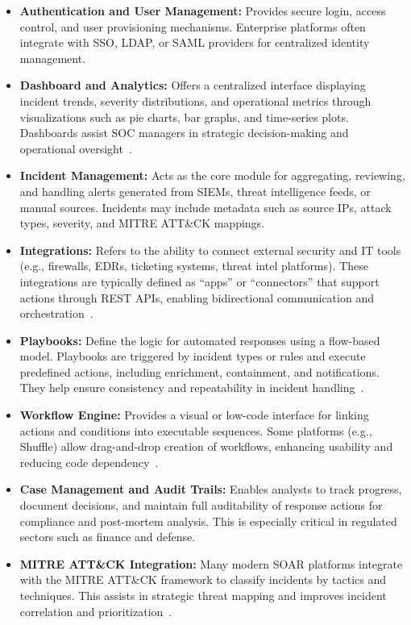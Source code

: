 \begin{itemize}
    \item \textbf{Authentication and User Management:} Provides secure login, access control, and user provisioning mechanisms. Enterprise platforms often integrate with SSO, LDAP, or SAML providers for centralized identity management.
    
    \item \textbf{Dashboard and Analytics:} Offers a centralized interface displaying incident trends, severity distributions, and operational metrics through visualizations such as pie charts, bar graphs, and time-series plots. Dashboards assist SOC managers in strategic decision-making and operational oversight~\cite{paloalto}.

    \item \textbf{Incident Management:} Acts as the core module for aggregating, reviewing, and handling alerts generated from SIEMs, threat intelligence feeds, or manual sources. Incidents may include metadata such as source IPs, attack types, severity, and MITRE ATT\&CK mappings.

    \item \textbf{Integrations:} Refers to the ability to connect external security and IT tools (e.g., firewalls, EDRs, ticketing systems, threat intel platforms). These integrations are typically defined as “apps” or “connectors” that support actions through REST APIs, enabling bidirectional communication and orchestration~\cite{techtarget}.

    \item \textbf{Playbooks:} Define the logic for automated responses using a flow-based model. Playbooks are triggered by incident types or rules and execute predefined actions, including enrichment, containment, and notifications. They help ensure consistency and repeatability in incident handling~\cite{splunk, paloalto}.

    \item \textbf{Workflow Engine:} Provides a visual or low-code interface for linking actions and conditions into executable sequences. Some platforms (e.g., Shuffle) allow drag-and-drop creation of workflows, enhancing usability and reducing code dependency~\cite{techtarget}.

    \item \textbf{Case Management and Audit Trails:} Enables analysts to track progress, document decisions, and maintain full auditability of response actions for compliance and post-mortem analysis. This is especially critical in regulated sectors such as finance and defense.

    \item \textbf{MITRE ATT\&CK Integration:} Many modern SOAR platforms integrate with the MITRE ATT\&CK framework to classify incidents by tactics and techniques. This assists in strategic threat mapping and improves incident correlation and prioritization~\cite{mitre}.
\end{itemize}

